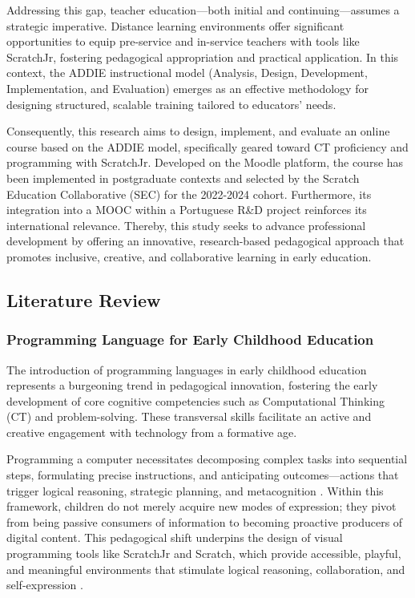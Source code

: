 \documentclass[english]{textolivre}
\begin{document}
Addressing this gap, teacher education—both initial and continuing—assumes a strategic imperative. Distance learning environments offer significant opportunities to equip pre-service and in-service teachers with tools like ScratchJr, fostering pedagogical appropriation and practical application. In this context, the ADDIE instructional model (Analysis, Design, Development, Implementation, and Evaluation) emerges as an effective methodology for designing structured, scalable training tailored to educators' needs.

Consequently, this research aims to design, implement, and evaluate an online course based on the ADDIE model, specifically geared toward CT proficiency and programming with ScratchJr. Developed on the Moodle platform, the course has been implemented in postgraduate contexts and selected by the Scratch Education Collaborative (SEC) for the 2022-2024 cohort. Furthermore, its integration into a MOOC within a Portuguese R\&D project reinforces its international relevance. Thereby, this study seeks to advance professional development by offering an innovative, research-based pedagogical approach that promotes inclusive, creative, and collaborative learning in early education.

\subsection{Literature Review}\label{sec-normas}

\subsubsection{Programming Language for Early Childhood Education}
The introduction of programming languages in early childhood education represents a burgeoning trend in pedagogical innovation, fostering the early development of core cognitive competencies such as Computational Thinking (CT) and problem-solving. These transversal skills facilitate an active and creative engagement with technology from a formative age.

Programming a computer necessitates decomposing complex tasks into sequential steps, formulating precise instructions, and anticipating outcomes—actions that trigger logical reasoning, strategic planning, and metacognition \cite{espadeiro2021pensamento}. Within this framework, children do not merely acquire new modes of expression; they pivot from being passive consumers of information to becoming proactive producers of digital content. This pedagogical shift underpins the design of visual programming tools like ScratchJr and Scratch, which provide accessible, playful, and meaningful environments that stimulate logical reasoning, collaboration, and self-expression \cite{roque2014family,roque2022facilitators}.
\end{document}
